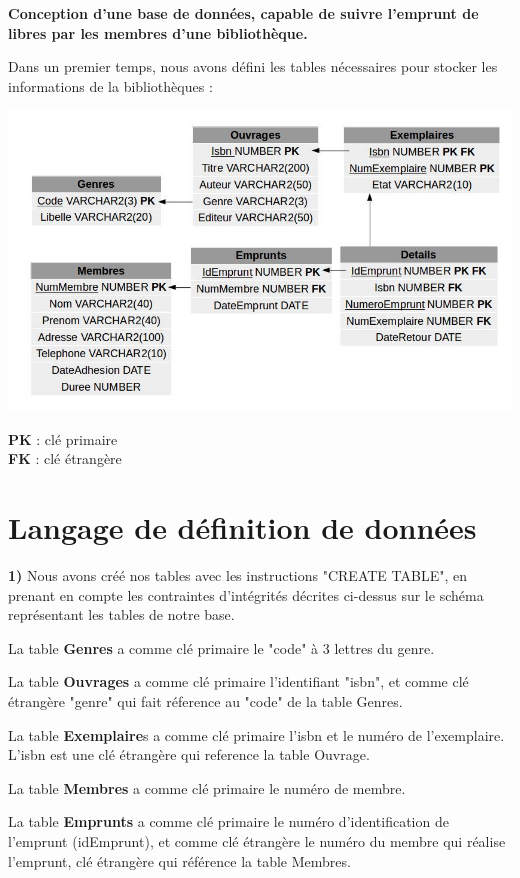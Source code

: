 \documentclass[a4paper,12pt]{article}
\begin{document}
 
\renewcommand{\contentsname}{Sommaire} 
\tableofcontents{} 
\clearpage


 \textbf{Conception d'une base de données, capable de suivre l'emprunt de libres par les membres d'une bibliothèque. }

Dans un premier temps, nous avons défini les tables nécessaires pour stocker les informations de la bibliothèques :

    \includegraphics[scale=0.5]{tables.png} 

 \textbf {PK} : clé primaire\\
 \textbf {FK} : clé étrangère


\section{Langage de définition de données}
 \textbf {1)} Nous avons créé nos tables avec les instructions "CREATE TABLE", en prenant en compte les contraintes d'intégrités décrites ci-dessus sur le schéma représentant les tables de notre base. 
 
  La table \textbf {Genres} a comme clé primaire le "code" à 3 lettres du genre.
  
 La table \textbf {Ouvrages} a comme clé primaire l'identifiant "isbn", et comme clé étrangère "genre" qui fait réference au "code" de la table Genres. 
 
 La table \textbf {Exemplaire}s a comme clé primaire l'isbn et le numéro de l'exemplaire. L'isbn est une clé étrangère qui reference la table Ouvrage. 
 
 La table \textbf {Membres} a comme clé primaire le numéro de membre. 
 
 La table \textbf {Emprunts} a comme clé primaire le numéro d'identification de l'emprunt (idEmprunt), et comme clé étrangère le numéro du membre qui réalise l'emprunt, clé étrangère qui référence la table Membres. 
 
\end{document}

